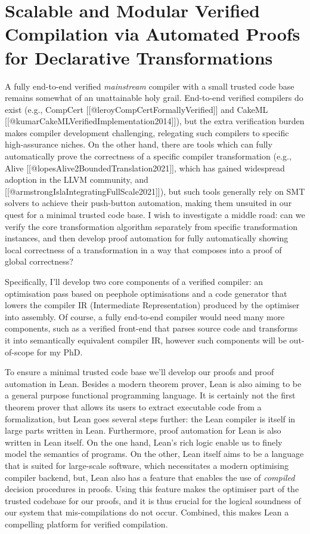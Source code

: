 \section{Scalable and Modular Verified Compilation via Automated Proofs
for Declarative
Transformations}\label{scalable-and-modular-verified-compilation-via-automated-proofs-for-declarative-transformations}

A fully end-to-end verified \emph{mainstream} compiler with a small
trusted code base remains somewhat of an unattainable holy grail.
End-to-end verified compilers do exist (e.g., CompCert
{[}{[}@leroyCompCertFormallyVerified{]}{]} and CakeML
{[}{[}@kumarCakeMLVerifiedImplementation2014{]}{]}), but the extra
verification burden makes compiler development challenging, relegating
such compilers to specific high-assurance niches. On the other hand,
there are tools which can fully automatically prove the correctness of a
specific compiler transformation (e.g., Alive
{[}{[}@lopesAlive2BoundedTranslation2021{]}{]}, which has gained
widespread adoption in the LLVM community, and
{[}{[}@armstrongIslaIntegratingFullScale2021{]}{]}), but such tools
generally rely on SMT solvers to achieve their push-button automation,
making them unsuited in our quest for a minimal trusted code base. I
wish to investigate a middle road: can we verify the core transformation
algorithm separately from specific transformation instances, and then
develop proof automation for fully automatically showing local
correctness of a transformation in a way that composes into a proof of
global correctness?

Specifically, I'll develop two core components of a verified compiler:
an optimisation pass based on peephole optimisations and a code
generator that lowers the compiler IR (Intermediate Representation)
produced by the optimiser into assembly. Of course, a fully end-to-end
compiler would need many more components, such as a verified front-end
that parses source code and transforms it into semantically equivalent
compiler IR, however such components will be out-of-scope for my PhD.

To ensure a minimal trusted code base we'll develop our proofs and proof
automation in Lean. Besides a modern theorem prover, Lean is also aiming
to be a general purpose functional programming language. It is certainly
not the first theorem prover that allows its users to extract executable
code from a formalization, but Lean goes several steps further: the Lean
compiler is itself in large parts written in Lean. Furthermore, proof
automation for Lean is also written in Lean itself. On the one hand,
Lean's rich logic enable us to finely model the semantics of programs.
On the other, Lean itself aims to be a language that is suited for
large-scale software, which necessitates a modern optimising compiler
backend, but, Lean also has a feature that enables the use of
\emph{compiled} decision procedures in proofs. Using this feature makes
the optimiser part of the trusted codebase for our proofs, and it is
thus crucial for the logical soundness of our system that
mis-compilations do not occur. Combined, this makes Lean a compelling
platform for verified compilation.

